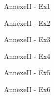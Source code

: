 
\begin{cadre}[B1][B4] 
  \begin{exercice*}
    AnnexeII - Ex1
  \end{exercice*}
  \begin{exercice*}
    AnnexeII - Ex2
  \end{exercice*}
  \begin{exercice*}
    AnnexeII - Ex3
  \end{exercice*}
  \begin{exercice*}
    AnnexeII - Ex4
  \end{exercice*}
  \begin{exercice*}
    AnnexeII - Ex5
  \end{exercice*}
  \begin{exercice*}
    AnnexeII - Ex6
  \end{exercice*}
\end{cadre}
